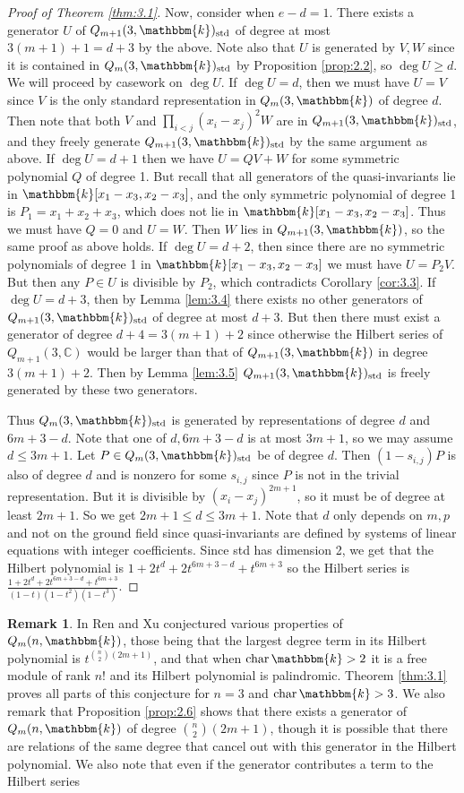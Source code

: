 \documentclass[11pt]{article}
\theoremstyle{definition}
\newtheorem{remark}[theorem]{Remark}
\renewcommand{\k}{\mathbbm{k}}
\newcommand{\std}{\mathrm{std}}
\renewcommand{\char}{\text{char\,}}
\newcommand{\C}{\mathbb{C}}
\begin{document}
\begin{proof}[Proof of Theorem \ref{thm:3.1}]
    Now, consider when $e-d=1$. There exists a generator $U$ of $Q_{m+1}(3,\k)_\std$ of degree at most $3(m+1)+1=d+3$ by the above. Note also that $U$ is generated by $V,W$ since it is contained in $Q_m(3,\k)_\std$ by Proposition \ref{prop:2.2}, so $\deg U\geq d$. We will proceed by casework on $\deg U$. If $\deg U=d$, then we must have $U=V$ since $V$ is the only standard representation in $Q_m(3,\k)$ of degree $d$. Then note that both $V$ and $\prod_{i<j}(x_i-x_j)^2W$ are in $Q_{m+1}(3,\k)_\std$, and they freely generate $Q_{m+1}(3,\k)_\std$ by the same argument as above. If $\deg U=d+1$ then we have $U=QV+W$ for some symmetric polynomial $Q$ of degree 1. But recall that all generators of the quasi-invariants lie in $\k[x_1-x_3,x_2-x_3]$, and the only symmetric polynomial of degree 1 is $P_1=x_1+x_2+x_3$, which does not lie in $\k[x_1-x_3,x_2-x_3]$. Thus we must have $Q=0$ and $U=W$. Then $W$ lies in $Q_{m+1}(3,\k)$, so the same proof as above holds. If $\deg U=d+2$, then since there are no symmetric polynomials of degree 1 in $\k[x_1-x_3,x_2-x_3]$ we must have $U=P_2V$. But then any $P\in U$ is divisible by $P_2$, which contradicts Corollary \ref{cor:3.3}. If $\deg U=d+3$, then by Lemma \ref{lem:3.4} there exists no other generators of $Q_{m+1}(3,\k)_\std$ of degree at most $d+3$. But then there must exist a generator of degree $d+4=3(m+1)+2$ since otherwise the Hilbert series of $Q_{m+1}(3,\C)$ would be larger than that of $Q_{m+1}(3,\k)$ in degree $3(m+1)+2$. Then by Lemma \ref{lem:3.5} $Q_{m+1}(3,\k)_\std$ is freely generated by these two generators.
    
    Thus $Q_m(3,\k)_\std$ is generated by representations of degree $d$ and $6m+3-d$. Note that one of $d,6m+3-d$ is at most $3m+1$, so we may assume $d\leq 3m+1$. Let $P\in Q_m(3,\k)_\std$ be of degree $d$. Then $(1-s_{i,j})P$ is also of degree $d$ and is nonzero for some $s_{i,j}$ since $P$ is not in the trivial representation. But it is divisible by $(x_i-x_j)^{2m+1}$, so it must be of degree at least $2m+1$. So we get $2m+1\leq d\leq 3m+1$. Note that $d$ only depends on $m,p$ and not on the ground field since quasi-invariants are defined by systems of linear equations with integer coefficients. Since std has dimension 2, we get that the Hilbert polynomial is $1+2t^d+2t^{6m+3-d}+t^{6m+3}$ so the Hilbert series is $\frac{1+2t^d+2t^{6m+3-d}+t^{6m+3}}{(1-t)(1-t^2)(1-t^3)}$.
\end{proof}
\begin{remark}
    In \cite{Ren_2020} Ren and Xu conjectured various properties of $Q_m(n,\k)$, those being that the largest degree term in its Hilbert polynomial is $t^{{n\choose{2}}(2m+1)}$, and that when $\char\k>2$ it is a free module of rank $n!$ and its Hilbert polynomial is palindromic. Theorem \ref{thm:3.1} proves all parts of this conjecture for $n=3$ and $\char\k>3$. We also remark that Proposition \ref{prop:2.6} shows that there exists a generator of $Q_m(n,\k)$ of degree ${n\choose{2}}(2m+1)$, though it is possible that there are relations of the same degree that cancel out with this generator in the Hilbert polynomial. We also note that even if the generator contributes a term to the Hilbert series
\end{remark}
\end{document}
